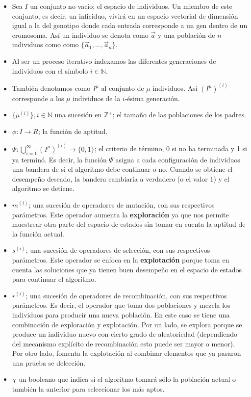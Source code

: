 \begin{itemize}
    \item Sea $I$ un conjunto no vacío; el espacio de individuos. Un miembro de este conjunto, es decir, un inficiduo, vivirá en un espacio vectorial de dimensión igual a la del genotipo donde cada entrada corresponde a un gen dentro de un cromosoma. Así un individuo se denota como $\vec{a}$ y una población de $n$ individuos como como $\{\vec{a}_1,\ldots , \vec{a}_n\}$.
    \item Al ser un proceso iterativo indexamos las diferentes generaciones de individuos con el símbolo $i\in\mathbb{N}$.
    \item También denotamos como $I^\mu$ al conjunto de $\mu$ individuos. Así ${(I^{\mu})}^{(i)}$ corresponde a los $\mu$ individuos de la $i$-ésima generación. 
    \item $\{\mu^{(i)}\}, i\in \mathbb{N}$ una sucesión en $\mathbb{Z}^+$; el tamaño de las poblaciones de los padres. 
    \item $\phi: I\rightarrow R$; la función de aptitud.
    \item $\Psi: \bigcup_{i=1}^\infty (I^{\mu})^{(i)}\rightarrow \{0,1\}$; el criterio de término, 0 si no ha terminada y 1 si ya terminó. Es decir, la función $\Psi$ asigna a cada configuración de individuos una bandera de si el algoritmo debe continuar o no. Cuando se obtiene el desempeño deseado, la bandera cambiaría a verdadero (o el valor 1) y el algoritmo se detiene. 
    \item $m^{(i)}$; una sucesión de operadores de mutación, con sus respectivos parámetros. Este operador aumenta la \textbf{exploración} ya que nos permite muestrear otra parte del espacio de estados sin tomar en cuenta la aptitud de la función actual.
    \item $s^{(i)}$; una sucesión de operadores de selección, con sus respectivos parámetros. Este operador  se enfoca en la \textbf{explotación} porque toma en cuenta las soluciones que ya tienen buen desempeño en el espacio de estados para continuar el algoritmo. 
    \item $r^{(i)}$; una sucesión de operadores de recombinación, con sus respectivos parámetros. Es decir, el operador que toma dos poblaciones y mezcla los individuos para producir una nueva población.  En este caso se tiene una combinación de exploración y explotación. Por un lado, se explora porque se produce un individuo nuevo con cierto grado de aleatoriedad (dependiendo del mecanismo explícito de recombinación esto puede ser mayor o menor). Por otro lado, fomenta la explotación al combinar elementos que ya pasaron una prueba se delección. 
    \item $\chi$ un booleano que indica si el algoritmo tomará sólo la población actual o también la anterior para seleccionar los más aptos.
\end{itemize}

